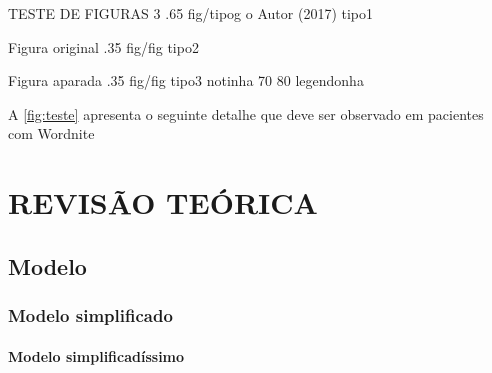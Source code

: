 \figura
{TESTE DE FIGURAS 3} %
{.65} %
{fig/tipog} %
{o Autor (2017)} %
{tipo1} %
{}
{}

\figura
{Figura original} %
{.35} %
{fig/fig} %
{\textcite{luminaria01}} %
{tipo2} %
{}
{}

\figurac
{Figura aparada} %
{.35} %
{fig/fig} %
{\textcite{luminaria01}} %
{tipo3} %
{notinha}   %
{70} %
{80} %
{legendonha}

A \autoref{fig:teste} apresenta o seguinte detalhe que deve ser observado em pacientes com Wordnite

\chapter{REVISÃO TEÓRICA}

\textcite[3.1-3.2]{abntex2modelo}

\textcite{luminaria01}

\textcite{luminaria01}


\textcite{luminaria01}



\textcite{luminaria01}

\textcite{ISO5122:1979}

\section{Modelo}

\subsection{Modelo simplificado}
\newpage
\textcite[3.1-3.2]{abntex2modelo}

\subsubsection{Modelo simplificadíssimo}